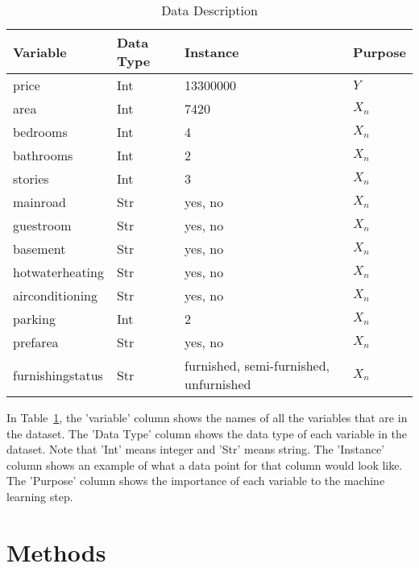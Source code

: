 \documentclass[12pt]{article}
\begin{document}
\begin{table}[ht] 
\caption{Data Description}
  \label{tab:rv}
\begin{tabular}{llll}
  \toprule
Variable & Data Type & Instance & Purpose \\
  \midrule
price & Int & 13300000 & \(Y\) \\ 
area & Int & 7420 & \(X_{n}\) \\ 
bedrooms & Int & 4 & \(X_{n}\) \\ 
bathrooms & Int & 2 & \(X_{n}\) \\ 
stories & Int & 3 & \(X_{n}\) \\ 
mainroad & Str & yes, no & \(X_{n}\) \\
guestroom & Str & yes, no & \(X_{n}\) \\
basement & Str & yes, no & \(X_{n}\) \\
hotwaterheating & Str & yes, no & \(X_{n}\) \\
airconditioning & Str & yes, no & \(X_{n}\) \\
parking & Int & 2 & \(X_{n}\) \\
prefarea & Str & yes, no & \(X_{n}\) \\
furnishingstatus & Str & furnished, semi-furnished, unfurnished & \(X_{n}\) \\
   \bottomrule
\end{tabular}\par
\bigskip
In Table~\ref{tab:rv}, the 'variable' column shows the names of all the variables that are in the dataset. The 'Data Type' column shows the data type of each variable in the dataset. Note that 'Int' means integer and 'Str' means string. The 'Instance' column shows an example of what a data point for that column would look like. The 'Purpose' column shows the importance of each variable to the machine learning step.
\end{table}


\bigskip
\bigskip


\section{Methods}
\label{sec:meth}

\end{document}
